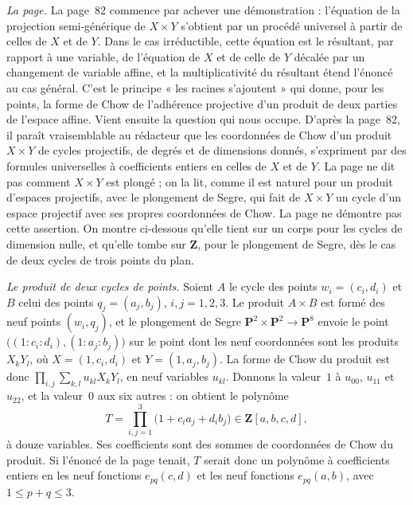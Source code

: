 \emph{La page.} La page~82 commence par achever une démonstration : l'équation de la projection semi-générique de $X \times Y$ s'obtient par un procédé universel à partir de celles de $X$ et de $Y$. Dans le cas irréductible, cette équation est le résultant, par rapport à une variable, de l'équation de $X$ et de celle de $Y$ décalée par un changement de variable affine, et la multiplicativité du résultant étend l'énoncé au cas général. C'est le principe « les racines s'ajoutent » qui donne, pour les points, la forme de Chow de l'adhérence projective d'un produit de deux parties de l'espace affine. Vient ensuite la question qui nous occupe. D'après la page~82, il paraît vraisemblable au rédacteur que les coordonnées de Chow d'un produit $X \times Y$ de cycles projectifs, de degrés et de dimensions donnés, s'expriment par des formules universelles à coefficients entiers en celles de $X$ et de $Y$. La page ne dit pas comment $X \times Y$ est plongé ; on la lit, comme il est naturel pour un produit d'espaces projectifs, avec le plongement de Segre, qui fait de $X \times Y$ un cycle d'un espace projectif avec ses propres coordonnées de Chow. La page ne démontre pas cette assertion. On montre ci-dessous qu'elle tient sur un corps pour les cycles de dimension nulle, et qu'elle tombe sur $\mathbf Z$, pour le plongement de Segre, dès le cas de deux cycles de trois points du plan.

\emph{Le produit de deux cycles de points.} Soient $A$ le cycle des points $w_i = (c_i, d_i)$ et $B$ celui des points $q_j = (a_j, b_j)$, $i, j = 1, 2, 3$. Le produit $A \times B$ est formé des neuf points $(w_i, q_j)$, et le plongement de Segre $\mathbf P^2 \times \mathbf P^2 \to \mathbf P^8$ envoie le point $\bigl((1 : c_i : d_i), (1 : a_j : b_j)\bigr)$ sur le point dont les neuf coordonnées sont les produits $X_k Y_l$, où $X = (1, c_i, d_i)$ et $Y = (1, a_j, b_j)$. La forme de Chow du produit est donc $\prod_{i,j} \sum_{k,l} u_{kl} X_k Y_l$, en neuf variables $u_{kl}$. Donnons la valeur~$1$ à $u_{00}$, $u_{11}$ et $u_{22}$, et la valeur~$0$ aux six autres : on obtient le polynôme
\[
T = \prod_{i, j = 1}^{3} \bigl(1 + c_i a_j + d_i b_j\bigr) \in \mathbf Z[a, b, c, d],
\]
à douze variables. Ses coefficients sont des sommes de coordonnées de Chow du produit. Si l'énoncé de la page tenait, $T$ serait donc un polynôme à coefficients entiers en les neuf fonctions $e_{pq}(c, d)$ et les neuf fonctions $e_{pq}(a, b)$, avec $1 \leq p + q \leq 3$.

